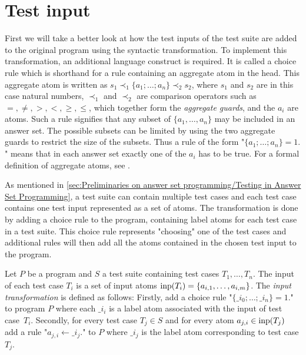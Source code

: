 \section{Test input}
\label{sec:Computing coverage metrics for propositional programs/Test input}
First we will take a better look at how the test inputs of the test suite are added to the original program using the syntactic transformation. To implement this transformation, an additional language construct is required. It is called a choice rule which is shorthand for a rule containing an aggregate atom in the head. This aggregate atom is written as \(s_1 \prec_1 \{a_1; \ldots; a_n\} \prec_2 s_2\), where $s_1$ and $s_2$ are in this case natural numbers, $\prec_1$ and $\prec_2$ are comparison operators such as $=, \neq, >, <, \geq, \leq$, which together form the \emph{aggregate guards}, and the $a_i$ are atoms. Such a rule signifies that any subset of $\{a_1, \ldots, a_n\}$ may be included in an answer set. The possible subsets can be limited by using the two aggregate guards to restrict the size of the subsets. Thus a rule of the form "\(\{a_1; \ldots;a_n\} = 1.\)" means that in each answer set exactly one of the $a_i$ has to be true. For a formal definition of aggregate atoms, see \textcite{Geb+15}.

As mentioned in \cref{sec:Preliminaries on answer set programming/Testing in Answer Set Programming}, a test suite can contain multiple test cases and each test case contains one test input represented as a set of atoms. The transformation is done by adding a choice rule to the program, containing label atoms for each test case in a test suite. This choice rule represents "choosing" one of the test cases and additional rules will then add all the atoms contained in the chosen test input to the program.

\begin{definition}
\label{def:input transforamtion}
    Let $P$ be a program and $S$ a test suite containing test cases \(T_1, \ldots, T_n\). The input of each test case $T_i$ is a set of input atoms \(\operatorname{inp}(T_i) = \{a_{i,1}, \ldots,a_{i,m}\}\). The \emph{input transformation} is defined as follows:
    Firstly, add a choice rule "\(\{\_i_0; \ldots;\_i_n\} = 1.\)" to program $P$  where each $\_i_i$ is a label atom associated with the input of test case~$T_i$. Secondly, for every test case \( T_j \in S\) and for every atom \( a_{j,i} \in \operatorname{inp}(T_j)\) add a rule "\(a_{j,i} \leftarrow \_i_j.\)" to $P$ where $\_i_j$ is the label atom corresponding to test case $T_j$.
\end{definition} 

